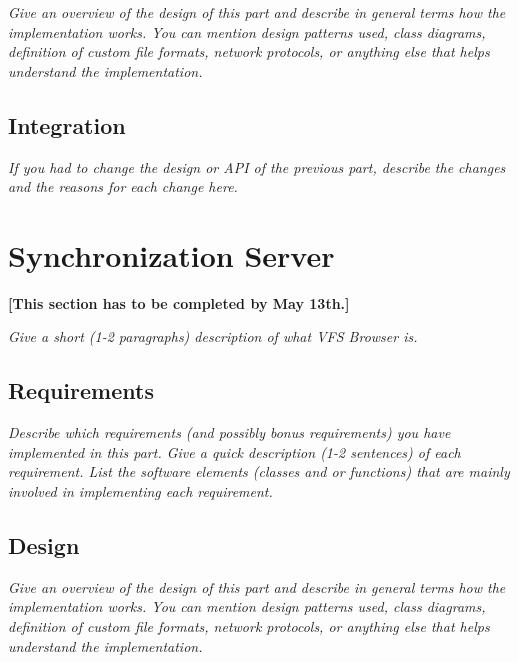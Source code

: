 \documentclass[a4paper,12pt]{article}
\begin{document}
\emph{Give an overview of the design of this part and describe in general terms how the implementation works. You can mention design patterns used, class diagrams, definition of custom file formats, network protocols, or anything else that helps understand the implementation.}


\subsection{Integration}

\emph{If you had to change the design or API of the previous part, describe the changes and the reasons for each change here.}




\section{Synchronization Server}

\textbf{[This section has to be completed by May 13th.]}

\emph{Give a short (1-2 paragraphs) description of what VFS Browser is.}


\subsection{Requirements}

\emph{Describe which requirements (and possibly bonus requirements) you have implemented in this part. Give a quick description (1-2 sentences) of each requirement. List the software elements (classes and or functions) that are mainly involved in implementing each requirement.}


\subsection{Design}

\emph{Give an overview of the design of this part and describe in general terms how the implementation works. You can mention design patterns used, class diagrams, definition of custom file formats, network protocols, or anything else that helps understand the implementation.}
\end{document}
